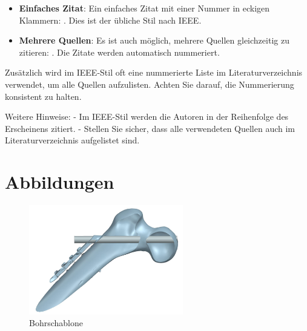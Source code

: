 \begin{itemize}
    \item \textbf{Einfaches Zitat}: Ein einfaches Zitat mit einer Nummer in eckigen Klammern: \cite{ChatGPTl}. Dies ist der übliche Stil nach IEEE.
    \item \textbf{Mehrere Quellen}: Es ist auch möglich, mehrere Quellen gleichzeitig zu zitieren: \cite{Richard.2020, Fushimi.Mehrzyklone}. Die Zitate werden automatisch nummeriert.
\end{itemize}

Zusätzlich wird im IEEE-Stil oft eine nummerierte Liste im Literaturverzeichnis verwendet, um alle Quellen aufzulisten. Achten Sie darauf, die Nummerierung konsistent zu halten.

Weitere Hinweise:
- Im IEEE-Stil werden die Autoren in der Reihenfolge des Erscheinens zitiert.
- Stellen Sie sicher, dass alle verwendeten Quellen auch im Literaturverzeichnis aufgelistet sind.


\section{Abbildungen}

\begin{figure}[H]
    \centering
    \includegraphics[width=0.6\textwidth]{abb1/bohrschablone_Seitenansicht.jpg} %
    \caption{Bohrschablone \cite{ChatGPTl}}
    \label{bild groß}
\end{figure}



